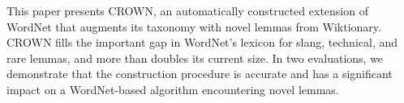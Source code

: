 This paper presents CROWN, an automatically constructed extension of WordNet that augments its taxonomy with novel lemmas from Wiktionary. CROWN fills the important gap in WordNet's lexicon for slang, technical, and rare lemmas, and more than doubles its current size.  In two evaluations, we demonstrate that the construction procedure is accurate and has a significant impact on a WordNet-based algorithm encountering novel lemmas.
